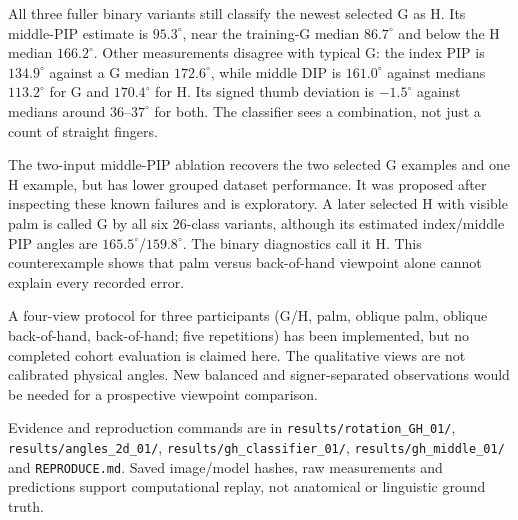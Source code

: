 All three fuller binary variants still classify the newest selected G as H. Its middle-PIP estimate is $95.3^\circ$, near the training-G median $86.7^\circ$ and below the H median $166.2^\circ$. Other measurements disagree with typical G: the index PIP is $134.9^\circ$ against a G median $172.6^\circ$, while middle DIP is $161.0^\circ$ against medians $113.2^\circ$ for G and $170.4^\circ$ for H. Its signed thumb deviation is $-1.5^\circ$ against medians around $36$--$37^\circ$ for both. The classifier sees a combination, not just a count of straight fingers.

The two-input middle-PIP ablation recovers the two selected G examples and one H example, but has lower grouped dataset performance. It was proposed after inspecting these known failures and is exploratory. A later selected H with visible palm is called G by all six 26-class variants, although its estimated index/middle PIP angles are $165.5^\circ$/$159.8^\circ$. The binary diagnostics call it H. This counterexample shows that palm versus back-of-hand viewpoint alone cannot explain every recorded error.

A four-view protocol for three participants (G/H, palm, oblique palm, oblique back-of-hand, back-of-hand; five repetitions) has been implemented, but no completed cohort evaluation is claimed here. The qualitative views are not calibrated physical angles. New balanced and signer-separated observations would be needed for a prospective viewpoint comparison.

Evidence and reproduction commands are in \texttt{results/rotation\_GH\_01/}, \texttt{results/angles\_2d\_01/}, \texttt{results/gh\_classifier\_01/}, \texttt{results/gh\_middle\_01/} and \texttt{REPRODUCE.md}. Saved image/model hashes, raw measurements and predictions support computational replay, not anatomical or linguistic ground truth.
